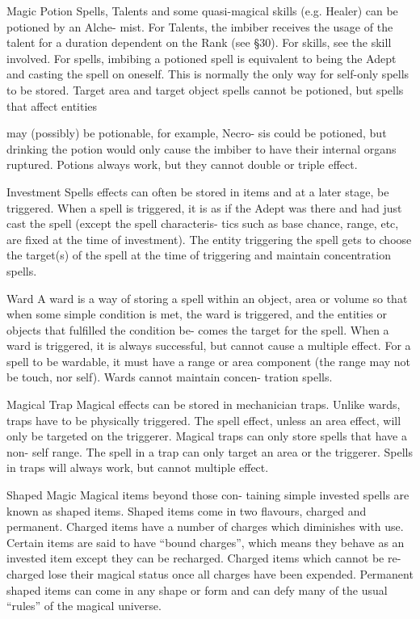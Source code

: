 \begin{Chapter}{Magic}
Potion  Spells,  Talents  and  some  quasi-magical 
skills  (e.g.  Healer)  can  be  potioned  by  an  Alche-
mist. For Talents, the imbiber receives the usage of 
the  talent  for  a  duration  dependent  on  the  Rank 
(see  §30).  For  skills,  see  the  skill  involved.  For 
spells,  imbibing  a  potioned  spell  is  equivalent  to 
being  the  Adept  and  casting  the  spell  on  oneself. 
This  is  normally  the  only  way  for  self-only  spells 
to  be  stored.  Target  area  and  target  object  spells 
cannot  be  potioned,  but  spells  that  affect  entities 

may (possibly) be potionable, for example, Necro-
sis  could  be  potioned,  but  drinking  the  potion 
would only cause the imbiber to have their internal 
organs  ruptured.  Potions  always  work,  but  they 
cannot double or triple effect. 

Investment  Spells  effects  can  often  be  stored  in 
items  and  at  a  later  stage,  be  triggered.  When  a 
spell is triggered, it is as if the Adept was there and 
had just cast the spell (except the spell characteris-
tics such as base chance, range, etc, are fixed at the 
time of investment). The entity triggering the spell 
gets to choose the target(s) of the spell at the time 
of triggering and maintain concentration spells. 

Ward A ward is a way of storing a spell within an 
object,  area  or  volume  so  that  when  some  simple 
condition  is  met,  the  ward  is  triggered,  and  the 
entities  or  objects  that  fulfilled  the  condition  be-
comes  the  target  for  the  spell.  When  a  ward  is 
triggered, it is always successful, but cannot cause 
a multiple effect. For a spell to be wardable, it must 
have a range or area component (the range may not 
be touch, nor self). Wards cannot maintain concen-
tration spells. 

Magical  Trap  Magical  effects  can  be  stored  in 
mechanician  traps.  Unlike  wards,  traps  have  to  be 
physically  triggered.  The  spell  effect,  unless  an 
area  effect,  will  only  be  targeted  on  the  triggerer. 
Magical traps can only store spells that have a non-
self  range.  The  spell  in  a  trap  can  only  target  an 
area  or  the  triggerer.  Spells  in  traps  will  always 
work, but cannot multiple effect. 

Shaped  Magic  Magical  items  beyond  those  con-
taining simple invested spells are known as shaped 
items. Shaped items come in two flavours, charged 
and  permanent.  Charged  items  have  a  number  of 
charges  which  diminishes  with  use.  Certain  items 
are  said  to  have  “bound  charges”,  which  means 
they behave as an invested item except they can be 
recharged.  Charged  items  which  cannot  be  re-
charged  lose  their  magical  status  once  all  charges 
have  been  expended.  Permanent  shaped  items  can 
come  in  any  shape  or  form  and  can  defy  many  of 
the usual “rules” of the magical universe. 

\end{Chapter}
